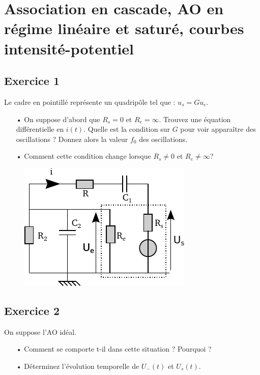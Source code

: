 \documentclass{report}
\begin{document}
\chapter*{Association en cascade, AO en régime linéaire et saturé, courbes intensité-potentiel}

\newpage

\section*{Exercice 1}

Le cadre en pointillé représente un quadripôle tel que : $u_{s}=Gu_{e}$.

\begin{itemize}

\item[•] On suppose d'abord que $R_{s}=0$ et $R_{e}=\infty$. Trouvez  une équation différentielle en $i(t)$. Quelle est la condition sur $G$ pour voir apparaître des oscillations ? Donnez alors la valeur $f_0$ des oscillations.

\item[•] Comment cette condition change lorsque $R_{s}\neq 0$ et $R_{e}\neq\infty$?

\end{itemize}

\begin{figure}[!h]
\centering
\includegraphics[width=0.5\linewidth]{circuit_5.pdf}
\end{figure}

\newpage

\section*{Exercice 2}

On suppose l'AO idéal. 

\begin{itemize}
	\item[•] Comment se comporte t-il dans cette situation ? Pourquoi ?
	\item[•] Déterminez l'évolution temporelle de  $U_{-}(t)$ et $U_{s}(t)$. 
\end{itemize}
\end{document}
